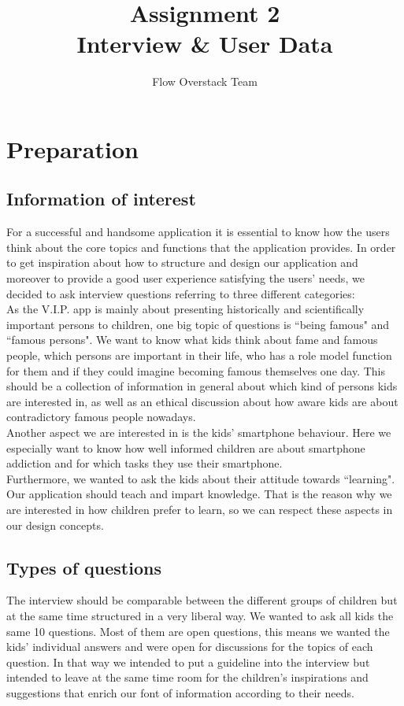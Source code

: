 \documentclass[12pt]{scrartcl}
\title{Assignment 2\\ Interview \& User Data}
\author{Flow Overstack Team}
\date{}
\begin{document}
\maketitle


\section*{Preparation}
	\subsection*{Information of interest}
		For a successful and handsome application it is essential to know how the users think about the core topics and functions that the application provides. In order to get inspiration about how to structure and design our application and moreover to provide a good user experience satisfying the users' needs, we decided to ask interview questions referring to three different categories:\\
		
		As the V.I.P. app is mainly about presenting historically and scientifically important persons to children, one big topic of questions is ``being famous" and ``famous persons". We want to know what kids think about fame and famous people, which persons are important in their life, who has a role model function for them and if they could imagine becoming famous themselves one day. This should be a collection of information in general about which kind of persons kids are interested in, as well as an ethical discussion about how aware kids are about contradictory famous people nowadays.\\
		
		Another aspect we are interested in is the kids' smartphone behaviour. Here we especially want to know how well informed children are about smartphone addiction and for which tasks they use their smartphone.\\
		
		Furthermore, we wanted to ask the kids about their attitude towards ``learning". Our application should teach and impart knowledge. That is the reason why we are interested in how children prefer to learn, so we can respect these aspects in our design concepts.\\
		
	\subsection*{Types of questions}
		The interview should be comparable between the different groups of children but at the same time structured in a very liberal way. We wanted to ask all kids the same 10 questions. Most of them are open questions, this means we wanted the kids' individual answers and were open for discussions for the topics of each question. In that way we intended to put a guideline into the interview but intended to leave at the same time room for the children's inspirations and suggestions that enrich our font of information according to their needs.
\end{document}
